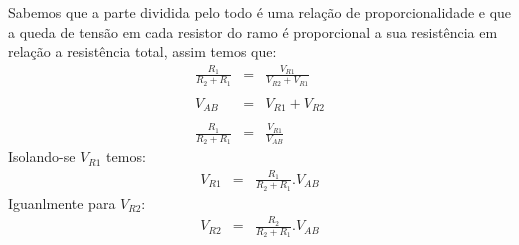 Sabemos que a parte dividida pelo todo é uma relação de proporcionalidade e que a queda de tensão em cada resistor do ramo é proporcional a sua resistência em relação a resistência total, assim temos que:
\begin{eqnarray}
\frac{R_1}{R_2+R_1} & = & \frac{V_{R1}}{V_{R2}+V_{R1}}\\
\nonumber\\
V_{AB} & = & V_{R1} + V_{R2} \\
\nonumber\\
\frac{R_1}{R_2+R_1} & = & \frac{V_{R1}}{V_{AB}}
\end{eqnarray}
Isolando-se $V_{R1}$  temos:
\begin{eqnarray}
V_{R1} & = & \frac{R_1}{R_2 + R_1} . V_{AB}
\end{eqnarray}
Iguanlmente para $V_{R2}$:
\begin{eqnarray}
V_{R2} & = & \frac{R_2}{R_2 + R_1} . V_{AB}
\end{eqnarray}
